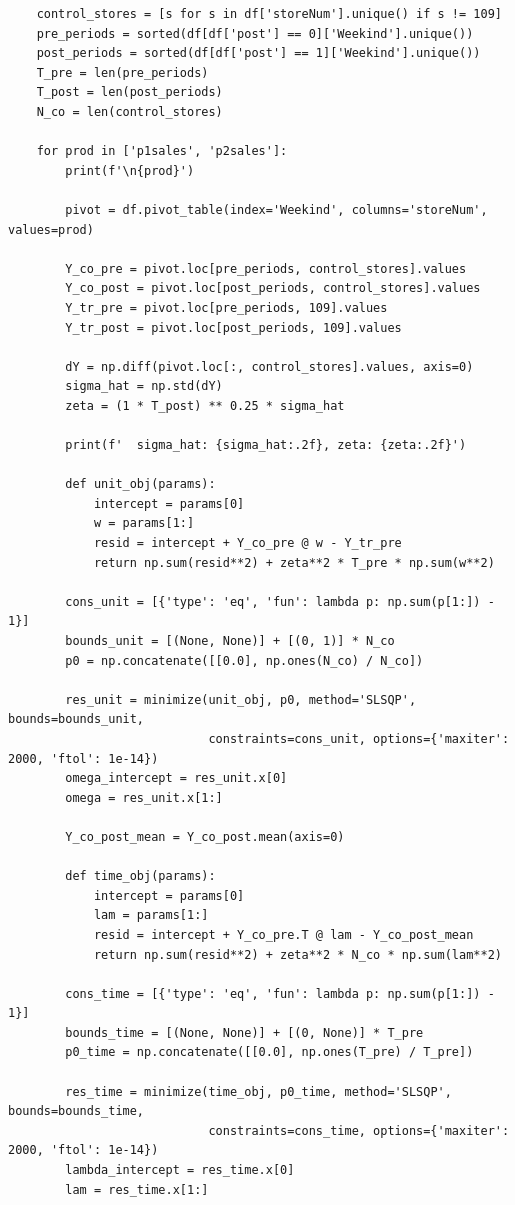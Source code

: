 \documentclass[10pt]{article}
\begin{document}
\begin{lstlisting}
    control_stores = [s for s in df['storeNum'].unique() if s != 109]
    pre_periods = sorted(df[df['post'] == 0]['Weekind'].unique())
    post_periods = sorted(df[df['post'] == 1]['Weekind'].unique())
    T_pre = len(pre_periods)
    T_post = len(post_periods)
    N_co = len(control_stores)

    for prod in ['p1sales', 'p2sales']:
        print(f'\n{prod}')

        pivot = df.pivot_table(index='Weekind', columns='storeNum', values=prod)

        Y_co_pre = pivot.loc[pre_periods, control_stores].values
        Y_co_post = pivot.loc[post_periods, control_stores].values
        Y_tr_pre = pivot.loc[pre_periods, 109].values
        Y_tr_post = pivot.loc[post_periods, 109].values

        dY = np.diff(pivot.loc[:, control_stores].values, axis=0)
        sigma_hat = np.std(dY)
        zeta = (1 * T_post) ** 0.25 * sigma_hat

        print(f'  sigma_hat: {sigma_hat:.2f}, zeta: {zeta:.2f}')

        def unit_obj(params):
            intercept = params[0]
            w = params[1:]
            resid = intercept + Y_co_pre @ w - Y_tr_pre
            return np.sum(resid**2) + zeta**2 * T_pre * np.sum(w**2)

        cons_unit = [{'type': 'eq', 'fun': lambda p: np.sum(p[1:]) - 1}]
        bounds_unit = [(None, None)] + [(0, 1)] * N_co
        p0 = np.concatenate([[0.0], np.ones(N_co) / N_co])

        res_unit = minimize(unit_obj, p0, method='SLSQP', bounds=bounds_unit,
                            constraints=cons_unit, options={'maxiter': 2000, 'ftol': 1e-14})
        omega_intercept = res_unit.x[0]
        omega = res_unit.x[1:]

        Y_co_post_mean = Y_co_post.mean(axis=0)

        def time_obj(params):
            intercept = params[0]
            lam = params[1:]
            resid = intercept + Y_co_pre.T @ lam - Y_co_post_mean
            return np.sum(resid**2) + zeta**2 * N_co * np.sum(lam**2)

        cons_time = [{'type': 'eq', 'fun': lambda p: np.sum(p[1:]) - 1}]
        bounds_time = [(None, None)] + [(0, None)] * T_pre
        p0_time = np.concatenate([[0.0], np.ones(T_pre) / T_pre])

        res_time = minimize(time_obj, p0_time, method='SLSQP', bounds=bounds_time,
                            constraints=cons_time, options={'maxiter': 2000, 'ftol': 1e-14})
        lambda_intercept = res_time.x[0]
        lam = res_time.x[1:]


\end{lstlisting}
\end{document}
